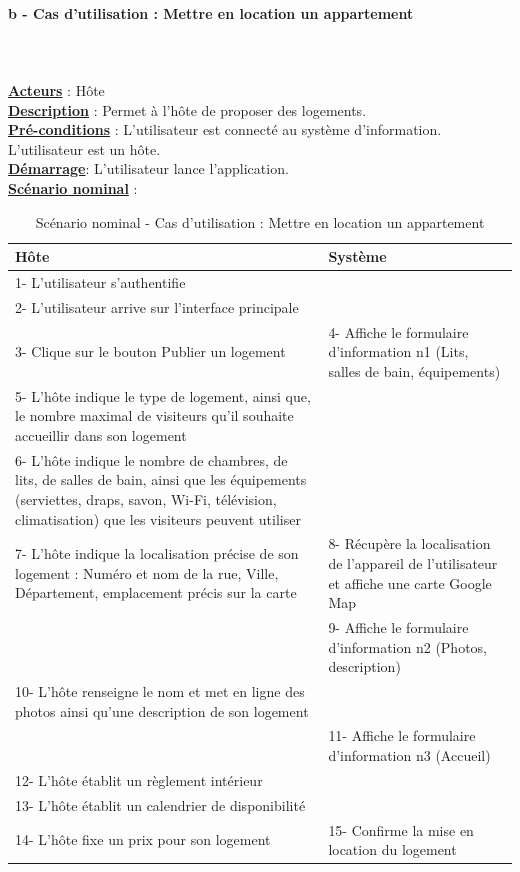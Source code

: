 \newpage
\paragraph{b - Cas d'utilisation : Mettre en location un appartement} 
$ $\\$ $\\\underline{\textbf{Acteurs}} : Hôte
\\\underline{\textbf{Description}} : Permet à l'hôte de proposer des logements.
\\\underline{\textbf{Pré-conditions}} : L'utilisateur est connecté au système d’information. L'utilisateur est un hôte.
\\\underline{\textbf{Démarrage}}: L’utilisateur lance l’application.
\\\underline{\textbf{Scénario nominal}} :

\begin{table}[H]
\begin{center}
\begin{tabular}{|p{8cm}|p{8cm}|}
\hline
Hôte & Système\\
\hline
1- L’utilisateur s’authentifie & $ $\\
\hline
2- L’utilisateur arrive sur l’interface principale  & $ $\\	
\hline
3- Clique sur le bouton Publier un logement & 4- Affiche le formulaire d’information n1 (Lits, salles de bain, équipements)\\
\hline
5- L'hôte indique le type de logement, ainsi que, le nombre maximal de visiteurs qu’il souhaite accueillir dans son logement & $ $\\
\hline
6- L'hôte indique le nombre de chambres, de lits, de salles de bain, ainsi que les équipements (serviettes, draps, savon, Wi-Fi, télévision, climatisation) que les visiteurs peuvent utiliser & $ $\\
\hline
7- L'hôte indique la localisation précise de son logement : Numéro et nom de la rue, Ville, Département, emplacement précis sur la carte & 8- Récupère la localisation de l’appareil de l’utilisateur et affiche une carte Google Map\\
\hline
$ $ & 9- Affiche le formulaire d’information n2 (Photos, description)\\
\hline
10- L'hôte renseigne le nom et met en ligne des photos ainsi qu’une description de son logement	 & $ $\\
\hline
$ $ & 11- Affiche le formulaire d’information n3 (Accueil)\\
\hline
12- L'hôte établit un règlement intérieur & $ $\\
\hline
13- L'hôte établit un calendrier de disponibilité	 & $ $\\
\hline
14- L'hôte fixe un prix pour son logement & 15- Confirme la mise en location du logement\\
\hline
\end{tabular}
\caption{Scénario nominal - Cas d'utilisation : Mettre en location un appartement}
\end{center}
\end{table}


